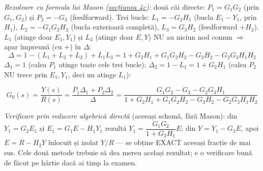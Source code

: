 \documentclass[10pt,a4paper]{article}
\begin{document}
\textit{Rezolvare cu formula lui Mason (\hyperref[sec:4c]{secțiunea 4c}):} două căi directe: $P_1{=}G_1G_2$ (prin $G_1,G_2$) și $P_2{=}{-}G_3$ (feedforward). Trei bucle: $L_1{=}{-}G_2H_1$ (bucla $E_1{-}Y_1$, prin $H_1$), $L_2{=}{-}G_1G_2H_2$ (bucla exterioară completă), $L_3{=}G_3H_2$ (feedforward $+H_2$). $L_1$ (atinge doar $E_1,Y_1$) și $L_3$ (atinge doar $E,Y$) NU au niciun nod comun $\Rightarrow$ apar împreună (cu $+$) în $\Delta$:
$$\Delta=1-(L_1{+}L_2{+}L_3)+L_1L_3=1+G_2H_1+G_1G_2H_2-G_3H_2-G_2G_3H_1H_2$$
$\Delta_1{=}1$ (calea $P_1$ atinge toate cele trei bucle); $\Delta_2{=}1{-}L_1{=}1{+}G_2H_1$ (calea $P_2$ NU trece prin $E_1,Y_1$, deci nu atinge $L_1$):
\begin{keyeq}\color{red!65!black}
$$G_0(s)=\dfrac{Y(s)}{R(s)}=\dfrac{P_1\Delta_1+P_2\Delta_2}{\Delta}=\dfrac{G_1G_2-G_3-G_2G_3H_1}{1+G_2H_1+G_1G_2H_2-G_3H_2-G_2G_3H_1H_2}$$
\end{keyeq}
\textit{Verificare prin reducere algebrică directă} (aceeași schemă, fără Mason): din $Y_1{=}G_2E_1$ și $E_1{=}G_1E{-}H_1Y_1$ rezultă $Y_1{=}\dfrac{G_1G_2}{1+G_2H_1}E$; din $Y{=}Y_1{-}G_3E$, apoi $E{=}R{-}H_2Y$ înlocuit și izolat $Y/R$ — se obține EXACT aceeași fracție de mai sus. Cele două metode trebuie să dea mereu același rezultat; e o verificare bună de făcut pe hârtie dacă ai timp la examen.
\end{document}
